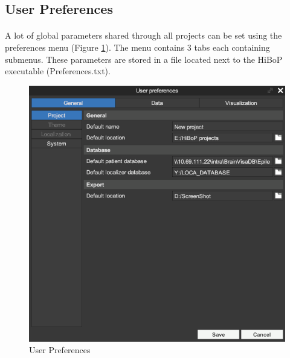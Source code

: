 \documentclass[a4paper]{article}
\begin{document}
\subsection{User Preferences}\label{preferences}
\paragraph{} A lot of global parameters shared through all projects can be set using the preferences menu (Figure \ref{preferencesUI}). The menu contains 3 tabs each containing submenus. These parameters are stored in a file located next to the HiBoP executable (Preferences.txt).
\begin{figure}[H]
\begin{center}
\includegraphics[scale=0.5]{Preferences.png}
\end{center}
\caption{\label{preferencesUI}User Preferences}
\end{figure}
\end{document}
